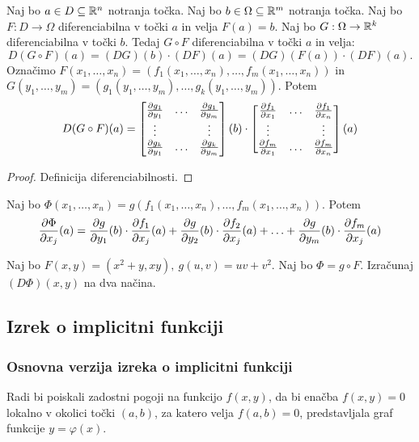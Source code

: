 \begin{izrek}
    Naj bo $a \in D \subseteq \mathbb{R}^n$ notranja točka. Naj bo $b \in \Omega \subseteq \mathbb{R}^m$ notranja točka. Naj bo $F: D \to \Omega$ diferenciabilna v točki $a$ in velja $F(a) = b$. Naj bo $G: \Omega \to \mathbb{R}^k$ diferenciabilna v točki $b$. Tedaj $G \circ F$ diferenciabilna v točki $a$ in velja:
    $$D(G \circ F)(a) = (DG)(b) \cdot (DF)(a) = (DG)(F(a)) \cdot (DF)(a).$$
    Označimo $F(x_1, \ldots, x_n) = (f_1(x_1, \ldots, x_n), \ldots, f_m(x_1, \ldots, x_n))$ in $G(y_1, \ldots, y_m) = (g_1(y_1, \ldots, y_m), \ldots, g_k(y_1, \ldots, y_m))$. Potem 
    $$D(G \circ F)(a) = \begin{bmatrix}
        \frac{\partial g_1}{\partial y_1} & \ldots & \frac{\partial g_1}{\partial y_m} \\
        \vdots & & \vdots \\
        \frac{\partial g_k}{\partial y_1} & \ldots & \frac{\partial g_k}{\partial y_m}
    \end{bmatrix}(b) \cdot \begin{bmatrix}
        \frac{\partial f_1}{\partial x_1} & \ldots & \frac{\partial f_1}{\partial x_n} \\
        \vdots & & \vdots \\
        \frac{\partial f_m}{\partial x_1} & \ldots & \frac{\partial f_m}{\partial x_n}
    \end{bmatrix}(a)$$
\end{izrek}

\begin{proof}
    Definicija diferenciabilnosti.
\end{proof}

\begin{posledica}[$k=1$, $G = g$ funkcija]
    Naj bo $\Phi(x_1, \ldots, x_n) = g(f_1(x_1, \ldots, x_n), \ldots, f_m(x_1, \ldots, x_n))$. Potem 
    $$\frac{\partial \Phi}{\partial x_j}(a) = \frac{\partial g}{\partial y_1}(b) \cdot \frac{\partial f_1}{\partial x_j}(a) + \frac{\partial g}{\partial y_2}(b) \cdot \frac{\partial f_2}{\partial x_j}(a) + \ldots + \frac{\partial g}{\partial y_m}(b) \cdot \frac{\partial f_m}{\partial x_j}(a)$$
\end{posledica}

\begin{zgled}
    Naj bo $F(x,y) = (x^2 + y, xy), \ g(u, v) = uv + v^2$. Naj bo $\Phi = g \circ F$. Izračunaj $(D\Phi)(x,y)$ na dva načina.
\end{zgled}

\newpage
\subsection{Izrek o implicitni funkciji}
\subsubsection{Osnovna verzija izreka o implicitni funkciji}
Radi bi poiskali zadostni pogoji na funkcijo $f(x, y)$, da bi enačba $f(x, y) = 0$ lokalno v okolici točki $(a,b)$, za katero velja $f(a,b) = 0$, predstavljala graf funkcije $y = \varphi(x)$.

